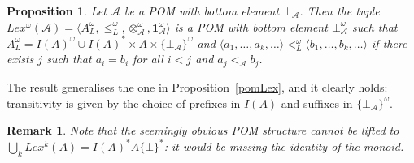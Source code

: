 \documentclass[a4paper]{elsarticle}
\newtheorem{remark}{Remark}
\newtheorem{proposition}{Proposition}
\newcommand{\monop}{\otimes}
\newcommand{\1}{\mathbf{1}}
\begin{document}
\begin{proposition}
Let $\mathcal{A}$ be a POM with bottom element $\bot_\mathcal{A}$.
%
Then the tuple $Lex^\omega(\mathcal{A}) = \langle A_L^\omega, \leq_L^\omega, \monop^\omega_\mathcal{A}, \1^\omega_\mathcal{A} \rangle$ 
is a POM	with bottom element $\bot^\omega_\mathcal{A}$ such that 
$A_L^\omega = I(A)^\omega \cup I(A)^\ast \times A \times \{\bot_\mathcal{A}\}^\omega$
and $\langle a_1, \ldots, a_k, \ldots \rangle <^\omega_L \langle b_1, \ldots, b_k, \ldots \rangle$ if there exists $j$ such that
$a_i = b_i$ for all $i < j$ and %
$a_{j} <_\mathcal{A}  b_{j}$.
\end{proposition}

The result generalises the one in Proposition~\ref{pomLex},
and it clearly holds: transitivity is given by the choice of prefixes in $I(A)$ and suffixes 
in $\{\bot_\mathcal{A}\}^\omega$.

\begin{remark}
	Note that the seemingly obvious POM structure cannot be 
	lifted to $\bigcup_k Lex^k(A) =  I(A)^\ast A \{\bot\}^\ast$: 
	it would be missing the identity of the monoid.
\end{remark}
\end{document}
